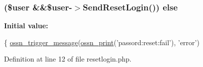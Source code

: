 \subsubsection[{\texorpdfstring{else}{else}}]{ (\${\bf user} \&\&\${\bf user}-\/$>$Send\+Reset\+Login()) else}\hypertarget{actions_2user_2resetlogin_8php_a014c381221281426c442e585cca17fdb}{}\label{actions_2user_2resetlogin_8php_a014c381221281426c442e585cca17fdb}
{\bfseries Initial value\+:}
\begin{DoxyCode}
\{
    \hyperlink{ossn_8lib_8system_8php_ab3f23f23f32f50c12e7aea0ffaccaac7}{ossn\_trigger\_message}(\hyperlink{ossn_8lib_8languages_8php_a2be5d1c4b695593a9b9067b96df2150a}{ossn\_print}(\textcolor{stringliteral}{'passord:reset:fail'}), \textcolor{stringliteral}{'error'})
\end{DoxyCode}


Definition at line 12 of file resetlogin.\+php.

